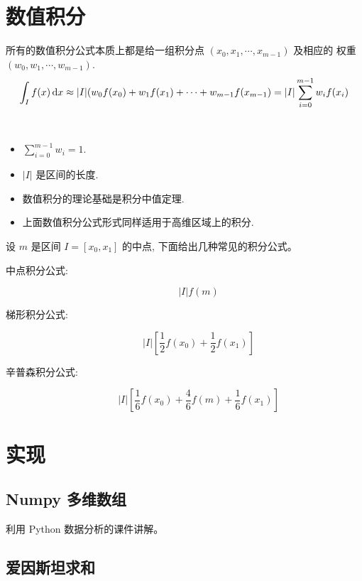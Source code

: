 \documentclass{article}
\begin{document}
\section{数值积分}

所有的数值积分公式本质上都是给一组积分点 $(x_0, x_1, \cdots, x_{m-1})$ 及相应的
权重 $(w_0, w_1, \cdots, w_{m-1})$. 
$$
\int_I f(x) \,\mathrm d x \approx |I|(w_0 f(x_0) + w_1 f(x_1) + \cdots + w_{m-1}
f(x_{m-1}) = |I|\sum_{i=0}^{m-1} w_if(x_i)
$$

\begin{framed}
    \begin{remark}
        ~
        \begin{itemize}
            \item $\sum_{i=0}^{m-1}w_i = 1$.
            \item $|I|$ 是区间的长度.
            \item 数值积分的理论基础是积分中值定理.
            \item 上面数值积分公式形式同样适用于高维区域上的积分.
        \end{itemize}
    \end{remark}
\end{framed}

\begin{framed}
    设 $m$ 是区间  $I = [x_0, x_1]$ 的中点, 下面给出几种常见的积分公式。
    \begin{description}
        \item[中点积分公式:] 
            $$ |I|f(m)$$
        \item[梯形积分公式:] 
            $$ |I|\left[\frac{1}{2}f(x_0) +\frac{1}{2}f(x_1) \right] $$
        \item[辛普森积分公式:]
            $$|I|\left[\frac{1}{6}f(x_0) + \frac{4}{6}f(m) + \frac{1}{6}f(x_1)\right]$$
    \end{description}
\end{framed}

\section{实现}

\subsection{Numpy 多维数组}

利用 Python 数据分析的课件讲解。

\subsection{爱因斯坦求和}
\end{document}
